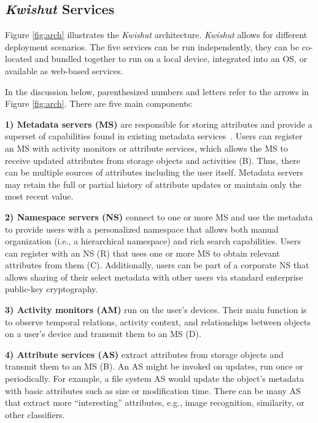 \subsection{\emph{Kwishut} Services}

Figure \ref{fig:arch} illustrates the \emph{Kwishut} architecture. \emph{Kwishut} allows for
different deployment scenarios. The five services can be run independently, they
can be co-located and bundled together to run on a local device, integrated into
an OS, or available as web-based services.

In the discussion below, parenthesized numbers and letters refer to the arrows
in Figure \ref{fig:arch}. There are five main components:

\noindent\textbf{1) Metadata servers (MS)}
are responsible for storing attributes and provide a superset of capabilities found in existing metadata services~\cite{federatedMetaData,smartstore}. Users can register an MS with activity monitors or attribute services, which allows the MS to receive updated attributes from storage objects and activities (B). Thus, there can be multiple sources of attributes including the user itself. Metadata servers may retain the full or partial history of attribute updates or maintain only the most recent value.

\noindent\textbf{2) Namespace servers (NS)}
connect to one or more MS and use the metadata to provide users with a
personalized namespace that allows both manual organization (i.e., a
hierarchical namespace) and rich search capabilities.
Users can register with an NS (R) that uses one or more MS to obtain relevant
attributes from them (C). Additionally, users can be part of a corporate NS that
allows sharing of their select metadata with other users via standard enterprise
public-key cryptography.


\noindent\textbf{3) Activity monitors (AM)}
run on the user's devices. Their main function is to observe temporal relations,
activity context, and relationships between objects on a user's device and
transmit them to an MS (D).


\noindent\textbf{4) Attribute services (AS)}
extract attributes from storage objects and transmit them to an MS (B). An AS
might be invoked on updates, run once or periodically. For example, a file
system AS would update the object's metadata with basic attributes such as size
or modification time. There can be many AS that extract more ``interesting''
attributes, e.g., image recognition, similarity, or other classifiers.

